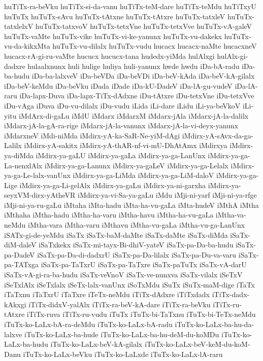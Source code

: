 {huTiTx-ra-beVku
huTiTx-si-da-vanu
huTiTx-teM-dare
huTiTx-teMdu
huTiTxyU
huTuTx
huTuTx-sAvu
huTuTx-tAtxne
huTuTx-tAtxre
huTuTx-tatxleV
huTuTx-tatxlelxV
huTuTx-tatxvoV
huTuTx-tetxVne
huTuTx-tetxVve
huTuTx-vA-galeV
huTuTx-vaMte
huTuTx-vike
huTuTx-vi-ke-yanunx
huTuTx-vu-dakekx
huTuTx-vu-da-kikxMta
huTuTx-vu-dilalx
huTuTx-vudu
hucacx
hucacx-naMte
hucacxneV
hucacx-rA-gi-ru-vaMte
hucucx
hucucx-tana
hudedx-yiMda
hulAlxgi
hulAlx-gi-dadxre
hulaalxnunx
huli
hulige
huliya
huli-yanunx
hwde
hwdu
iDa-bA-radu
iDa-ba-hudu
iDa-ba-lalxveV
iDa-beVDa
iDa-beVDi
iDa-beV-kAda
iDa-beV-kA-gilalx
iDa-beV-keMdu
iDa-beVku
iDada
iDade
iDa-kU-DadeV
iDa-lA-gu-vudeV
iDa-lA-raru
iDa-lapx-Duva
iDa-lapx-TiTx-dAdxne
iDu-tAtxre
iDu-tetxVne
iDu-tetxVve
iDu-vAga
iDuva
iDu-vu-dilalx
iDu-vudu
iLida
iLi-dare
iLidu
iLi-ya-beVkoV
iLi-yitu
iMdArx-di-gaLu
iMdU
iMdarx
iMdarxM
iMdarx-jAla
iMdarx-jA-la-dalilx
iMdarx-jA-la-gA-ra-rige
iMdarx-jA-la-vanunx
iMdarx-jA-la-vi-deyx-yanunx
iMdarxneV
iMdi-niMda
iMdirx-yA-ka-SaR-Ne-yiM-dAgi
iMdirx-yA-sAvx-da-ga-Lalilx
iMdirx-yA-sakitx
iMdirx-yA-thAR-nf-vi-mU-DhAtAmx
iMdirxya
iMdirx-ya-diMda
iMdirx-ya-gaLU
iMdirx-ya-gaLa
iMdirx-ya-ga-LanUnx
iMdirx-ya-ga-La-nenxlAlx
iMdirx-ya-ga-Lanunx
iMdirx-ya-gaLeV
iMdirx-ya-ga-Lelalx
iMdirx-ya-ga-Le-lalx-vanUnx
iMdirx-ya-ga-LiMda
iMdirx-ya-ga-LiM-daloV
iMdirx-ya-ga-Lige
iMdirx-ya-ga-Li-gelAlx
iMdirx-ya-gaLu
iMdirx-ya-ni-garxha
iMdirx-ya-seyxVM-dirx-yAtheVR
iMdirx-ya-vi-Sa-ya-gaLu
iMdu
iMji-ni-yarf
iMji-ni-ya-rfge
iMji-ni-ya-ru-gaLu
iMtaha
iMta-hadu
iMta-ha-vu-gaLa
iMta-hudeV
iMthA
iMtha
iMthaha
iMtha-hadu
iMtha-ha-varu
iMtha-havu
iMtha-ha-vu-gaLa
iMtha-va-neMdu
iMtha-vara
iMtha-varu
iMthavu
iMtha-vu-gaLa
iMtha-vu-ga-LanUnx
iSATx-gi-de-yeMdu
iSaTx
iSaTx-baM-daMte
iSaTx-daMte
iSaTx-diMda
iSaTx-diM-daleV
iSaTxkekx
iSaTx-mi-tayx-Bi-dhiV-yateV
iSaTx-pa-Da-ba-hudu
iSaTx-pa-DadeV
iSaTx-pa-Da-di-dadxrU
iSaTx-pa-Da-lilalx
iSaTx-pa-Du-va-varu
iSaTx-pa-TATxga
iSaTx-pa-TaTxrU
iSaTx-pa-TaTxre
iSaTx-paTuTx
iSaTx-vA-darU
iSaTx-vA-gi-ra-ba-hudu
iSaTx-veVnoV
iSaTx-ve-nunxva
iSaTx-vilalx
iSeTxV
iSeTxlAlx
iSeTxlalx
iSeTx-lalx-vanUnx
iSoTxMdu
iSuTx
iSuTx-maM-dige
iTaTx
iTaTxnu
iTaTxrU
iTaTxre
iTeTx-neMdu
iTiTx-dAdxre
iTiTxdadx
iTiTx-dadx-kAkxgi
iTiTx-didxV-yalAlx
iTiTx-ra-beV-kA-dare
iTiTx-ra-beVku
iTiTx-ru-tAtxre
iTiTx-ruva
iTiTx-ru-vudu
iTuTx
iTuTx-bi-TaTxnu
iTuTx-bi-TeTx-neMdu
iTuTx-ko-LaLx-bA-ra-deMdu
iTuTx-ko-LaLx-bA-radu
iTuTx-ko-LaLx-ba-hu-da-lalxve
iTuTx-ko-LaLx-ba-hude
iTuTx-ko-LaLx-ba-hu-deM-du-koMDu
iTuTx-ko-LaLx-ba-hudu
iTuTx-ko-LaLx-beV-kA-gilalx
iTuTx-ko-LaLx-beV-keM-du-koM-Danu
iTuTx-ko-LaLx-beVku
iTuTx-ko-LaLxde
iTuTx-ko-LaLx-lA-raru
}

